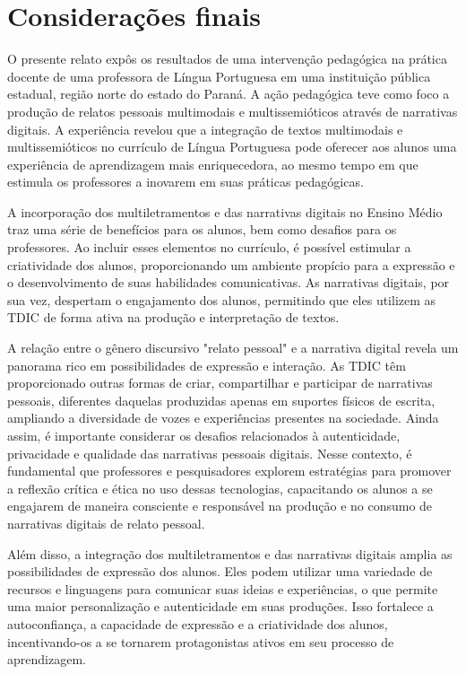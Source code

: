 \documentclass[portuguese]{textolivre}
\begin{document}
\section{Considerações finais}

O presente relato expôs os resultados de uma intervenção pedagógica na prática docente de uma professora de Língua Portuguesa em uma instituição pública estadual, região norte do estado do Paraná. A ação pedagógica teve como foco a produção de relatos pessoais multimodais e multissemióticos através de narrativas digitais. A experiência revelou que a integração de textos multimodais e multissemióticos no currículo de Língua Portuguesa pode oferecer aos alunos uma experiência de aprendizagem mais enriquecedora, ao mesmo tempo em que estimula os professores a inovarem em suas práticas pedagógicas.

A incorporação dos multiletramentos e das narrativas digitais no Ensino Médio traz uma série de benefícios para os alunos, bem como desafios para os professores. Ao incluir esses elementos no currículo, é possível estimular a criatividade dos alunos, proporcionando um ambiente propício para a expressão e o desenvolvimento de suas habilidades comunicativas. As narrativas digitais, por sua vez, despertam o engajamento dos alunos, permitindo que eles utilizem as TDIC de forma ativa na produção e interpretação de textos.

A relação entre o gênero discursivo "relato pessoal" e a narrativa digital revela um panorama rico em possibilidades de expressão e interação. As TDIC têm proporcionado outras formas de criar, compartilhar e participar de narrativas pessoais, diferentes daquelas produzidas apenas em suportes físicos de escrita, ampliando a diversidade de vozes e experiências presentes na sociedade. Ainda assim, é importante considerar os desafios relacionados à autenticidade, privacidade e qualidade das narrativas pessoais digitais. Nesse contexto, é fundamental que professores e pesquisadores explorem estratégias para promover a reflexão crítica e ética no uso dessas tecnologias, capacitando os alunos a se engajarem de maneira consciente e responsável na produção e no consumo de narrativas digitais de relato pessoal.

Além disso, a integração dos multiletramentos e das narrativas digitais amplia as possibilidades de expressão dos alunos. Eles podem utilizar uma variedade de recursos e linguagens para comunicar suas ideias e experiências, o que permite uma maior personalização e autenticidade em suas produções. Isso fortalece a autoconfiança, a capacidade de expressão e a criatividade dos alunos, incentivando-os a se tornarem protagonistas ativos em seu processo de aprendizagem.
\end{document}
